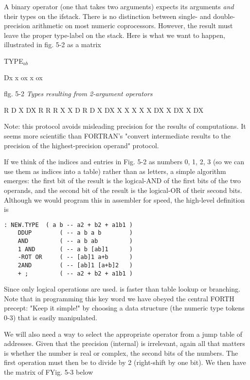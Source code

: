 A binary operator (one that takes two arguments) expects its arguments \textit{and} their types on the ifstack. There is no distinction between single- and double-precision arithmetic on most numeric coprocessors. However, the result must leave the proper type-label on the stack. Here is what we want to happen, illustrated in fig. 5-2 as a matrix 

TYPE$_{ab}$

Dx  x ox x ox

flg. 5-2 \textit{Types resulting from 2-argument operators}

   R D  X DX
R  R R  X X
D  R D  X DX
X  X X  X X
DX X DX X DX 

\leftbar[1\linewidth]
Note: this protocol avoids misleading precision for the results of computations. It seems more scientific than FORTRAN's "convert intermediate results to the precision of the highest-precision operand" protocol.
\endleftbar

If we think of the indices and entries in Fig. 5-2 as numbers 0, 1, 2, 3 (so we can use them as indices into a table) rather than as letters, a simple algorithm emerges: the first bit of the result is the logical-AND of the first bits of the two operands, and the second bit of the result is the logical-OR of their second bits. Although we would program this in assembler for speed, the high-level definition is

\begin{lstlisting}
: NEW.TYPE  ( a b -- a2 + b2 + a1b1 )
    DDUP        ( -- a b a b        )
    AND         ( -- a b ab         )
    1 AND       ( -- a b [ab]1      )
    -ROT OR     ( -- [ab]1 a+b      )
    2AND        ( -- [ab]1 [a+b]2   )
    + ;         ( -- a2 + b2 + a1b1 )
\end{lstlisting}

Since only logical operations are used.  is faster than table lookup or branching. Note that in programming this key word we have obeyed the central FORTH precept: "Keep it simple!" by choosing a data structure (the numeric type tokens 0-3) that is easily manipulated.

We will also need a way to select the appropriate operator from a jump table of addresses. Given that the precision (internal) is irrelevant, again all that matters is whether the number is real or complex, \ie the second bits of the numbers. The first operation must then be to divide by 2 (right-shift by one bit). We then have the matrix of FYig. 5-3 below


